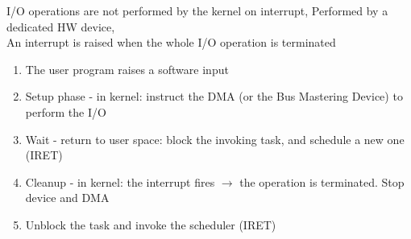 I/O operations are not performed by the kernel on interrupt, Performed by a dedicated HW device,\\
An interrupt is raised when the whole I/O operation is terminated

\begin{enumerate}
    \item The user program raises a software input
    \item Setup phase - in kernel: instruct the DMA (or the Bus Mastering Device) to perform the I/O
    \item Wait - return to user space: block the invoking task, and schedule a new one (IRET)
    \item Cleanup - in kernel: the interrupt fires $\rightarrow$ the operation is terminated. Stop device and DMA
    \item Unblock the task and invoke the scheduler (IRET)
\end{enumerate}
